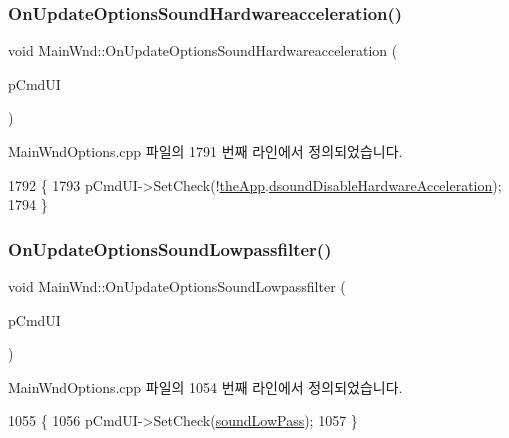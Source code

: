 \subsubsection{\texorpdfstring{On\+Update\+Options\+Sound\+Hardwareacceleration()}{OnUpdateOptionsSoundHardwareacceleration()}}
{\footnotesize\ttfamily void Main\+Wnd\+::\+On\+Update\+Options\+Sound\+Hardwareacceleration (\begin{DoxyParamCaption}\item[{C\+Cmd\+UI $\ast$}]{p\+Cmd\+UI }\end{DoxyParamCaption})}



Main\+Wnd\+Options.\+cpp 파일의 1791 번째 라인에서 정의되었습니다.


\begin{DoxyCode}
1792 \{
1793   pCmdUI->SetCheck(!\mbox{\hyperlink{_v_b_a_8cpp_a8095a9d06b37a7efe3723f3218ad8fb3}{theApp}}.\mbox{\hyperlink{class_v_b_a_a58f89c52283d10a0fcaac8abb7eca524}{dsoundDisableHardwareAcceleration}});
1794 \}
\end{DoxyCode}
\mbox{\label{class_main_wnd_a3dce17aef080623fbfb5b044b0602cd1}} 
\subsubsection{\texorpdfstring{On\+Update\+Options\+Sound\+Lowpassfilter()}{OnUpdateOptionsSoundLowpassfilter()}}
{\footnotesize\ttfamily void Main\+Wnd\+::\+On\+Update\+Options\+Sound\+Lowpassfilter (\begin{DoxyParamCaption}\item[{C\+Cmd\+UI $\ast$}]{p\+Cmd\+UI }\end{DoxyParamCaption})\hspace{0.3cm}{\ttfamily [protected]}}



Main\+Wnd\+Options.\+cpp 파일의 1054 번째 라인에서 정의되었습니다.


\begin{DoxyCode}
1055 \{
1056   pCmdUI->SetCheck(\mbox{\hyperlink{gb_sound_8cpp_aec5149401826955810b6cdef5758badb}{soundLowPass}});
1057 \}
\end{DoxyCode}
\mbox{\label{class_main_wnd_a63964846dcc81703c9041f4b4c6d92c2}} 
